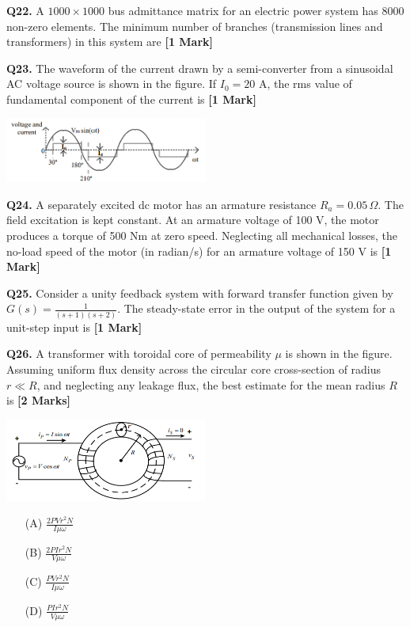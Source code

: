 \documentclass[11pt]{article}
\newcommand{\questiona}[2]{
    \noindent\textbf{Q#2.} #1 \hfill \textbf{[1 Mark]}
}
\newcommand{\questionb}[2]{
    \noindent\textbf{Q#2.} #1 \hfill \textbf{[2 Marks]}
}
\begin{document}
\questiona{A \( 1000 \times 1000 \) bus admittance matrix for an electric power system has 8000 non-zero elements. The minimum number of branches (transmission lines and transformers) in this system are}{22}
\vspace{0.5cm}

\questiona{The waveform of the current drawn by a semi-converter from a sinusoidal AC voltage source is shown in the figure. If \( I_0 = 20 \) A, the rms value of fundamental component of the current is}{23}
\begin{center}
\includegraphics[width=0.5\textwidth]{figures/23.png}
\end{center}
\vspace{0.5cm}

\questiona{A separately excited dc motor has an armature resistance \( R_a = 0.05 \, \Omega \). The field excitation is kept constant. At an armature voltage of 100 V, the motor produces a torque of 500 Nm at zero speed. Neglecting all mechanical losses, the no-load speed of the motor (in radian/s) for an armature voltage of 150 V is}{24}
\vspace{0.5cm}

\questiona{Consider a unity feedback system with forward transfer function given by \( G(s) = \frac{1}{(s+1)(s+2)} \). The steady-state error in the output of the system for a unit-step input is}{25}
\vspace{0.5cm}

\questionb{A transformer with toroidal core of permeability \( \mu \) is shown in the figure. Assuming uniform flux density across the circular core cross-section of radius \( r \ll R \), and neglecting any leakage flux, the best estimate for the mean radius \( R \) is}{26}
\begin{center}
\includegraphics[width=0.5\textwidth]{figures/26.png}
\end{center}
\begin{enumerate}
    \item[(A)] \( \frac{2P V r^2 N}{I \mu \omega} \)
    \item[(B)] \( \frac{2P I r^2 N}{V \mu \omega} \)
    \item[(C)] \( \frac{P V r^2 N}{I \mu \omega} \)
    \item[(D)] \( \frac{P I r^2 N}{V \mu \omega} \)
\end{enumerate}
\vspace{0.5cm}
\end{document}
